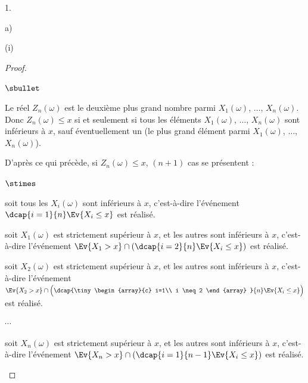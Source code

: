 \documentclass[11pt]{article}%
\begin{document}
\begin{noliste}{1.}
\begin{noliste}{a)}
\begin{nonoliste}{(i)}
      \begin{proof}~
        \begin{noliste}{$\sbullet$}
	  \item Le réel $Z_n(\omega)$ est le deuxième plus grand 
	  nombre parmi $X_1(\omega)$, $\ldots$, $X_n(\omega)$. Donc 
	  $Z_n(\omega) \leq x$ si et seulement si tous les éléments 
	  $X_1(\omega)$, $\ldots$, $X_n(\omega)$ sont inférieurs à 
	  $x$, sauf éventuellement un (le plus grand élément parmi
	  $X_1(\omega)$, $\ldots$, $X_n(\omega)$).
	  
	  
	  \item D'après ce qui précède, si $Z_n(\omega) \leq x$, 
	  $(n+1)$ cas se présentent :
        \end{noliste}
        \begin{liste}{$\stimes$}
          \item soit tous les $X_i(\omega)$ sont inférieurs à $x$, 
          c'est-à-dire l'événement $\dcap{i=1}{n} \Ev{X_i \leq x}$
          est réalisé.
          
          \item soit $X_1(\omega)$ est strictement 
          supérieur à $x$, et les autres sont inférieurs à $x$, 
          c'est-à-dire l'événement $\Ev{X_1 >x} \cap \left(
          \dcap{i=2}{n} \Ev{X_i \leq x}\right)$ est réalisé.
          
          \item soit $X_2(\omega)$ est strictement 
          supérieur à $x$, et les autres sont inférieurs à $x$, 
          c'est-à-dire l'événement $\Ev{X_2 >x} \cap \Big(
          \dcap{\tiny
          \begin{array}{c}
            i=1\\
            i \neq 2
          \end{array}
          }{n} \Ev{X_i \leq x}\Big)$ est réalisé.
          
          \item $\cdots$
          
          \item soit $X_n(\omega)$ est strictement 
          supérieur à $x$, et les autres sont inférieurs à $x$, 
          c'est-à-dire l'événement $\Ev{X_n >x} \cap \left(
          \dcap{i=1}{n-1} \Ev{X_i \leq x}\right)$ est réalisé.
        \end{liste}
        

\end{proof}
\end{nonoliste}
\end{noliste}
\end{noliste}
\end{document}
